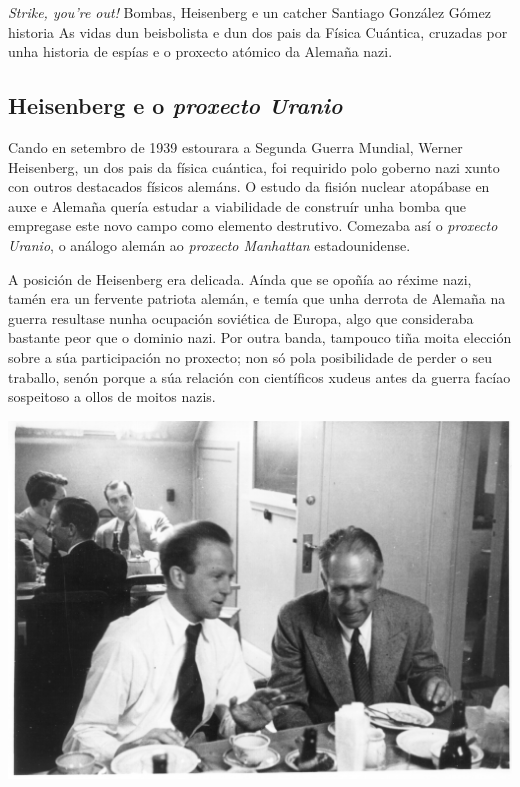 \Titular%
{\textit{Strike, you're out!} Bombas, Heisenberg e un catcher}%
{Santiago González Gómez}%
{historia}%
{As vidas dun beisbolista e dun dos pais da Física Cuántica, cruzadas por unha
historia de espías e o proxecto atómico da Alemaña nazi.}%

\begin{refsection}
\begin{multicols}{2}

\subsection*{Heisenberg e o \textit{proxecto Uranio}}

Cando en setembro de 1939 estourara a Segunda Guerra Mundial, Werner
Heisenberg, un dos pais da física cuántica, foi requirido polo goberno nazi
xunto con outros destacados físicos alemáns. O estudo da fisión nuclear
atopábase en auxe e Alemaña quería estudar a viabilidade de construír unha
bomba que empregase este novo campo como elemento destrutivo. Comezaba así o
\textit{proxecto Uranio}, o análogo alemán ao \textit{proxecto Manhattan}
estadounidense.

A posición de Heisenberg era delicada. Aínda que se opoñía ao réxime nazi,
tamén era un fervente patriota alemán, e temía que unha derrota de Alemaña na
guerra resultase nunha ocupación soviética de Europa, algo que consideraba
bastante peor que o dominio nazi. Por outra banda, tampouco tiña moita elección
sobre a súa participación no proxecto; non só pola posibilidade de perder o seu
traballo, senón porque a súa relación con científicos xudeus antes da guerra
facíao sospeitoso a ollos de moitos nazis.

\begin{centering}
    \includegraphics[width=0.65\linewidth]{revistas/002/imaxes/bohr.jpg}
\end{centering}


\end{multicols}
\end{refsection}
